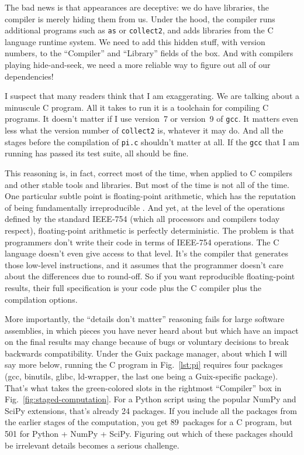 \documentclass[10pt,journal,compsoc]{IEEEtran}
\begin{document}
The bad news is that appearances are deceptive: we do have libraries, the compiler is merely hiding them from us. Under the hood, the compiler runs additional programs such as \texttt{as} or \texttt{collect2}, and adds libraries from the C language runtime system. We need to add this hidden stuff, with version numbers, to the ``Compiler'' and ``Library'' fields of the box. And with compilers playing hide-and-seek, we need a more reliable way to figure out all of our dependencies!

I suspect that many readers think that I am exaggerating. We are talking about a minuscule C program. All it takes to run it is a toolchain for compiling C programs. It doesn't matter if I use version~7 or version~9 of \texttt{gcc}. It matters even less what the version number of \texttt{collect2} is, whatever it may do. And all the stages before the compilation of \texttt{pi.c} shouldn't matter at all. If the \texttt{gcc} that I am running has passed its test suite, all should be fine.

This reasoning is, in fact, correct most of the time, when applied to C compilers and other stable tools and libraries. But most of the time is not all of the time. One particular subtle point is floating-point arithmetic, which has the reputation of being fundamentally irreproducible \cite{approximation-tower}. And yet, at the level of the operations defined by the standard IEEE-754 (which all processors and compilers today respect), floating-point arithmetic is perfectly deterministic. The problem is that programmers don't write their code in terms of IEEE-754 operations. The C language doesn't even give access to that level. It's the compiler that generates those low-level instructions, and it assumes that the programmer doesn't care about the differences due to round-off. So if you want reproducible floating-point results, their full specification is your code plus the C compiler plus the compilation options.

More importantly, the ``details don't matter'' reasoning fails for large software assemblies, in which pieces you have never heard about but which have an impact on the final results may change because of bugs or voluntary decisions to break backwards compatibility. Under the Guix package manager, about which I will say more below, running the C program in Fig.~\ref{lst:pi} requires four packages (gcc, binutils, glibc, ld-wrapper, the last one being a Guix-specific package). That's what takes the green-colored slots in the rightmost ``Compiler'' box in Fig.~\ref{fig:staged-computation}. For a Python script using the popular NumPy and SciPy extensions, that's already 24 packages. If you include all the packages from the earlier stages of the computation, you get 89~packages for a C program, but 501 for Python + NumPy + SciPy. Figuring out which of these packages should be irrelevant details becomes a serious challenge.
\end{document}
